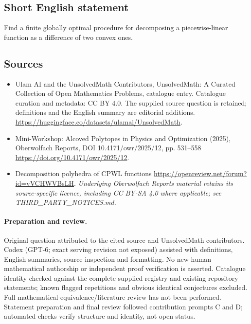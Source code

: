 \documentclass[11pt]{article}
\begin{document}
\subsection{Short English statement}
Find a finite globally optimal procedure for decomposing a piecewise-linear function as a difference of two convex ones.
\subsection{Sources}
\begin{itemize}
\item[\hypertarget{source:statement:1}{S1}] Ulam AI and the UnsolvedMath Contributors, UnsolvedMath: A Curated Collection of Open Mathematics Problems, catalogue entry. Catalogue curation and metadata: CC BY 4.0. The supplied source question is retained; definitions and the English summary are editorial additions.
\url{https://huggingface.co/datasets/ulamai/UnsolvedMath}.
\item[\hypertarget{source:statement:2}{S2}] Mini-Workshop: Alcoved Polytopes in Physics and Optimization (2025), Oberwolfach Reports, DOI 10.4171/owr/2025/12, pp. 531--558
\url{https://doi.org/10.4171/owr/2025/12}.
\item[\hypertarget{source:statement:3}{S3}] Decomposition polyhedra of CPWL functions
\url{https://openreview.net/forum?id=vVCHWVBsLH}.
\textit{Underlying Oberwolfach Reports material retains its source-specific licence, including CC BY-SA 4.0 where applicable; see THIRD\_PARTY\_NOTICES.md.}
\end{itemize}
\paragraph{Preparation and review.}
Original question attributed to the cited source and UnsolvedMath contributors. Codex (GPT-6; exact serving revision not exposed) assisted with definitions, English summaries, source inspection and formatting. No new human mathematical authorship or independent proof verification is asserted. Catalogue identity checked against the complete supplied registry and existing repository statements; known flagged repetitions and obvious identical conjectures excluded. Full mathematical-equivalence/literature review has not been performed. Statement preparation and final review followed contribution prompts C and D; automated checks verify structure and identity, not open status.
\label{end:statement}
\end{document}
